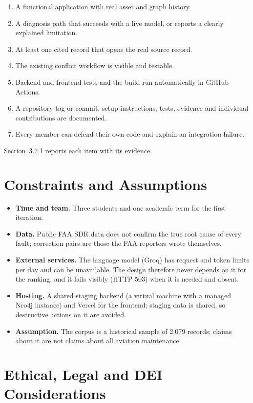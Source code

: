 \begin{enumerate}[label=\Alph*.]
\item A functional application with real asset and graph history.
\item A diagnosis path that succeeds with a live model, or reports a clearly explained limitation.
\item At least one cited record that opens the real source record.
\item The existing conflict workflow is visible and testable.
\item Backend and frontend tests and the build run automatically in GitHub Actions.
\item A repository tag or commit, setup instructions, tests, evidence and individual contributions are documented.
\item Every member can defend their own code and explain an integration failure.
\end{enumerate}

Section~3.7.1 reports each item with its evidence.

\section{Constraints and Assumptions}

\begin{itemize}
\item \textbf{Time and team.} Three students and one academic term for the first iteration.
\item \textbf{Data.} Public FAA SDR data does not confirm the true root cause of every fault; correction pairs are those the FAA reporters wrote themselves.
\item \textbf{External services.} The language model (Groq) has request and token limits per day and can be unavailable. The design therefore never depends on it for the ranking, and it fails visibly (HTTP 503) when it is needed and absent.
\item \textbf{Hosting.} A shared staging backend (a virtual machine with a managed Neo4j instance) and Vercel for the frontend; staging data is shared, so destructive actions on it are avoided.
\item \textbf{Assumption.} The corpus is a historical sample of 2,079 records; claims about it are not claims about all aviation maintenance.
\end{itemize}

\section{Ethical, Legal and DEI Considerations}

